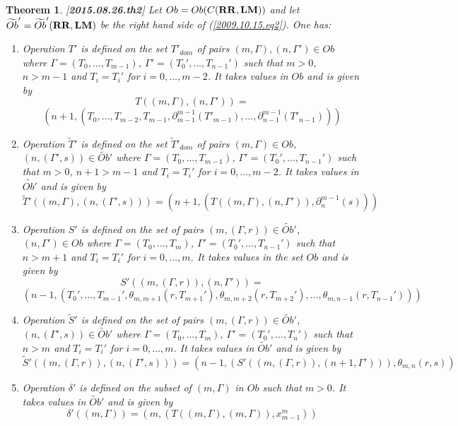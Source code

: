 \documentclass[11pt]{article}
\newtheorem{theorem}[proposition]{Theorem}
\newcommand{\llabel}[1]{\label{#1}[{\bf #1}]}
\newcommand{\wt}{\widetilde}
\newcommand{\RR}{{\bf RR}}
\newcommand{\LM}{{\bf LM}}
\begin{document}
  
%
\begin{theorem}\llabel{2015.08.26.th2}
Let $Ob=Ob(C(\RR,\LM))$ and let $\wt{Ob}'=\wt{Ob}'(\RR,\LM)$ be the right hand side of (\ref{2009.10.15.eq2}). One has:
%
\begin{enumerate}
\item Operation $T'$ is defined on the set $T'_{dom}$ of pairs $(m,\Gamma),(n,\Gamma')\in Ob$ where $\Gamma=(T_0,\dots,T_{m-1})$, $\Gamma'=(T_0',\dots,T_{n-1}')$ such that $m>0$, $n>m-1$ and $T_i=T_i'$ for $i=0,\dots,m-2$. It takes values in $Ob$ and is given by 
%
$$T((m,\Gamma),(n,\Gamma'))=$$$$(n+1,(T_0,\dots,T_{m-2},T_{m-1},\partial_{m-1}^{m-1}(T'_{m-1}),\dots,\partial_{n-1}^{m-1}(T'_{n-1})))$$
%
\item Operation $\wt{T}'$ is defined on the set $\wt{T}'_{dom}$ of pairs $(m,\Gamma)\in Ob$, $(n,(\Gamma',s))\in\wt{Ob}'$ where $\Gamma=(T_0,\dots,T_{m-1})$, $\Gamma'=(T_0',\dots,T_{n-1}')$ such that $m>0$, $n+1>m-1$ and $T_i=T_i'$ for $i=0,\dots,m-2$. It takes values in $\wt{Ob'}$ and is given by
%
$$\wt{T}'((m,\Gamma),(n,(\Gamma',s)))=(n+1,(T((m,\Gamma),(n,\Gamma')),\partial_{n}^{m-1}(s)))$$
%
\item Operation $S'$ is defined on the set of pairs $(m,(\Gamma,r))\in \wt{Ob}'$, $(n,\Gamma')\in Ob$ where $\Gamma=(T_0,\dots,T_{m})$, $\Gamma'=(T_0',\dots,T_{n-1}')$ such that $n>m+1$ and $T_i=T_i'$ for $i=0,\dots,m$. It takes values in the set $Ob$ and is given by 
%
$$S'((m,(\Gamma,r)),(n,\Gamma'))=$$$$(n-1,(T_0',\dots,T_{m-1}',\theta_{m,m+1}(r,T_{m+1}'),\theta_{m,m+2}(r,T_{m+2}'),\dots,\theta_{m,n-1}(r,T_{n-1}')))$$
%
\item Operation $\wt{S}'$ is defined on the set of pairs $(m,(\Gamma,r))\in \wt{Ob}'$, $(n,(\Gamma',s))\in \wt{Ob}'$ where $\Gamma=(T_0,\dots,T_{m})$, $\Gamma'=(T_0',\dots,T_{n}')$ such that $n>m$ and $T_i=T_i'$ for $i=0,\dots,m$. It takes values in $\wt{Ob}'$ and is given by 
%
$$\wt{S}'((m,(\Gamma,r)),(n,(\Gamma',s)))=(n-1,(S'((m,(\Gamma,r)),(n+1,\Gamma'))),\theta_{m,n}(r,s))$$
%
\item Operation $\delta'$ is defined on the subset of $(m,\Gamma)$ in $Ob$ such that $m>0$. It takes values in $\wt{Ob}'$ and is given by 
%
$$\delta'((m,\Gamma))=(m,(T((m,\Gamma),(m,\Gamma)),x_{m-1}^m))$$
%
\end{enumerate}
\end{theorem}
%
\end{document}
